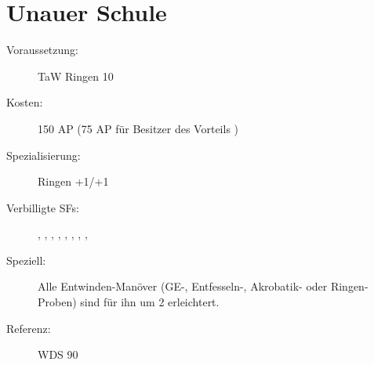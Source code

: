 \section{Unauer Schule}
\label{uSpez.unauer_schule}
\begin{description}
    \item[Voraussetzung:]
        TaW Ringen 10
    \item[Kosten:]
        150 AP (75 AP für Besitzer des Vorteils )
    \item[Spezialisierung:]
        Ringen +1/+1
    \item[Verbilligte SFs:]
        , , , , , , , , 
    \item[Speziell:]
        Alle Entwinden-Manöver (GE-, Entfesseln-, Akrobatik- oder Ringen-Proben) sind für ihn um 2 erleichtert.
    \item [Referenz:]
        WDS 90
\end{description}
